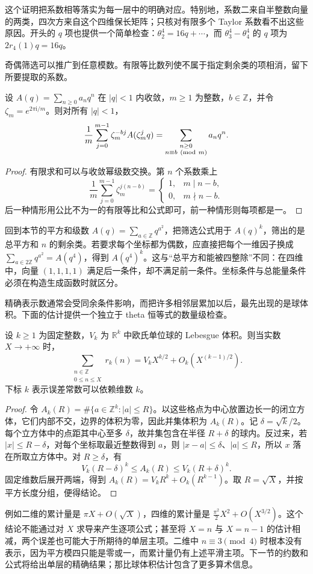 这个证明把系数相等落实为每一层中的明确对应。特别地，系数二来自半整数向量的两类，四次方来自这个四维保长矩阵；只核对有限多个 Taylor 系数看不出这些原因。开头的 \(q\) 项也提供一个简单检查：\(\theta_2^4=16q+\cdots\)，而 \(\theta_3^4-\theta_4^4\) 的 \(q\) 项为 \(2r_4(1)q=16q\)。

\ProseParagraphBreak

奇偶筛选可以推广到任意模数。有限等比数列使不属于指定剩余类的项相消，留下所要提取的系数。

\begin{proposition}[剩余类筛选]\label{b3:prop:24-residue-filter}
设 \(A(q)=\sum_{n\ge0}a_nq^n\) 在 \(|q|<1\) 内收敛，\(m\ge1\) 为整数，\(b\in\mathbb Z\)，并令 \(\zeta_m=e^{2\pi\mathrm{i}/m}\)。则对所有 \(|q|<1\)，
\[
 \frac1m\sum_{j=0}^{m-1}\zeta_m^{-bj}A(\zeta_m^j q)
 =\sum_{\substack{n\ge0\\n\equiv b\ ({\rm mod}\ m)}}a_nq^n.
\]
\end{proposition}
\begin{proof}
有限求和可以与收敛幂级数交换。第 \(n\) 个系数乘上
\[
 \frac1m\sum_{j=0}^{m-1}\zeta_m^{j(n-b)}
 =\begin{cases}1,&m\mid n-b,\\0,&m\nmid n-b.\end{cases}
\]
后一种情形用公比不为一的有限等比和公式即可，前一种情形则每项都是一。
\end{proof}

回到本节的平方和级数 \(A(q)=\sum_{a\in\mathbb Z}q^{a^2}\)，把筛选公式用于 \(A(q)^k\)，筛出的是总平方和 \(n\) 的剩余类。若要求每个坐标都为偶数，应直接把每个一维因子换成
\(\sum_{a\in2\mathbb Z}q^{a^2}=A(q^4)\)，得到 \(A(q^4)^k\)。这与“总平方和能被四整除”不同：在四维中，向量 \((1,1,1,1)\) 满足后一条件，却不满足前一条件。坐标条件与总能量条件必须在构造生成函数时就区分。

\ProseParagraphBreak

精确表示数通常会受同余条件影响，而把许多相邻层累加以后，最先出现的是球体积。下面的估计提供一个独立于 theta 恒等式的数量级检查。

\begin{proposition}[平方和的累计计数]\label{b3:prop:24-average-counting}
设 \(k\ge1\) 为固定整数，\(V_k\) 为 \(\mathbb R^k\) 中欧氏单位球的 Lebesgue 体积。则当实数 \(X\to+\infty\) 时，
\[
 \sum_{\substack{n\in\mathbb Z\\0\le n\le X}}r_k(n)
 =V_kX^{k/2}+O_k\!\left(X^{(k-1)/2}\right).
\]
下标 \(k\) 表示误差常数可以依赖维数 \(k\)。
\end{proposition}
\begin{proof}
令 \(A_k(R)=\#\{a\in\mathbb Z^k:|a|\le R\}\)。以这些格点为中心放置边长一的闭立方体，它们内部不交，边界的体积为零，因此并集体积为 \(A_k(R)\)。记 \(\delta=\sqrt{k}/2\)。每个立方体中的点距其中心至多 \(\delta\)，故并集包含在半径 \(R+\delta\) 的球内。反过来，若 \(|x|\le R-\delta\)，对每个坐标取最近整数得到 \(a\)，则
\(|x-a|\le\delta\)、\(|a|\le R\)，所以 \(x\) 落在所取立方体中。对 \(R\ge\delta\)，有
\[
 V_k(R-\delta)^k\le A_k(R)\le V_k(R+\delta)^k.
\]
固定维数后展开两端，得到 \(A_k(R)=V_kR^k+O_k(R^{k-1})\)。取 \(R=\sqrt X\)，并按平方长度分组，便得结论。
\end{proof}

例如二维的累计量是 \(\pi X+O(\sqrt X)\)，四维的累计量是
\(\frac{\pi^2}{2}X^2+O(X^{3/2})\)。这个结论不能通过对 \(X\) 求导来产生逐项公式；甚至将 \(X=n\) 与 \(X=n-1\) 的估计相减，两个误差也可能大于所期待的单层主项。二维中 \(n\equiv3\pmod4\) 时根本没有表示，因为平方模四只能是零或一，而累计量仍有上述平滑主项。下一节的约数和公式将给出单层的精确结果；那比球体积估计包含了更多算术信息。
